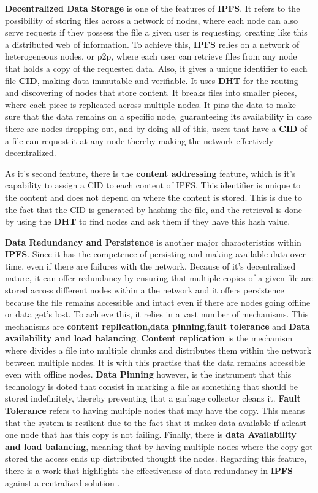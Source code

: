 \textbf{Decentralized Data Storage} is one of the features of \textbf{IPFS}. It refers to the possibility of storing files across a network of nodes, where each node can also serve requests if they possess the file a given user is requesting, creating like this a distributed web of information. To achieve this, \textbf{IPFS} relies on a network of heterogeneous nodes, or p2p, where each user can retrieve files from any node that holds a copy of the requested data. Also, it gives a unique identifier to each file \textbf{CID}, making data immutable and verifiable. It uses \textbf{DHT} for the routing and discovering of nodes that store content. It breaks files into smaller pieces, where each piece is replicated across multiple nodes. It pins the data to make sure that the data remains on a specific node, guaranteeing its availability in case there are nodes dropping out, and by doing all of this, users that have a \textbf{CID} of a file can request it at any node thereby making the network effectively decentralized.

As it's second feature, there is the \textbf{content addressing} feature, which is it's capability to assign a CID to each content of IPFS. This identifier is unique to the content and does not depend on where the content is stored. This is due to the fact that the CID is generated by hashing the file, and the retrieval is done by using the \textbf{DHT} to find nodes and ask them if they have this hash value.

\textbf{Data Redundancy and Persistence} is another major characteristics within \textbf{IPFS}. Since it has the competence of persisting and making available data over time, even if there are failures with the network. Because of it's decentralized nature, it can offer redundancy by ensuring that multiple copies of a given file are stored across different nodes within a the network and it offers persistence because the file remains accessible and intact even if there are nodes going offline or data get's lost. To achieve this, it relies in a vast number of mechanisms. This mechanisms are \textbf{content replication},\textbf{data pinning},\textbf{fault tolerance} and \textbf{Data availability and load balancing}. \textbf{Content replication} is the mechanism where  divides a file into multiple chunks and distributes them within the network between multiple nodes. It is with this practise that the data remains accessible even with offline nodes. \textbf{Data Pinning} however, is the instrument that this technology is doted that consist in marking a file as something that should be stored indefinitely, thereby preventing that a garbage collector cleans it. \textbf{Fault Tolerance} refers to having multiple nodes that may have the copy. This means that the system is resilient due to the fact that it makes data available if atleast one node that has this copy is not failing. Finally, there is \textbf{data Availability and load balancing}, meaning that by having multiple nodes where the copy got stored the access ends up distributed thought the nodes. Regarding this feature, there is a work that highlights the effectiveness of data redundancy in \textbf{IPFS} against a centralized solution \cite{ipfs-persistence}.

